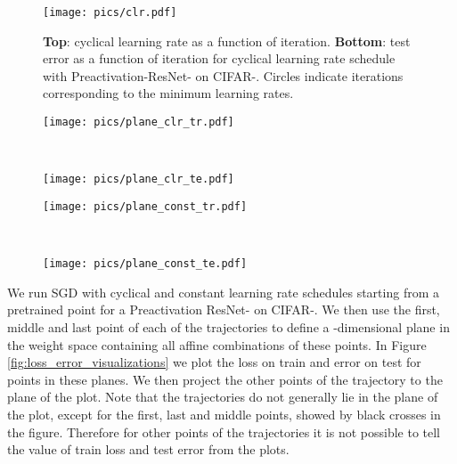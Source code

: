 \documentclass[letterpaper]{article}
\begin{document}
\begin{figure}[!t]
	\centering
	\texttt{[image: pics/clr.pdf]}
	\caption{
        \textbf{Top}: cyclical learning rate as a function of iteration. 
        \textbf{Bottom}: test error as a function of iteration
        for cyclical learning rate schedule with Preactivation-ResNet- on 
        CIFAR-.
        Circles indicate iterations corresponding to the minimum learning rates.
    }
	\label{fig:lr}    	
\end{figure}

\begin{figure*}[!h]
	\centering
	\begin{subfigure}{0.24\textwidth}
    \texttt{[image: pics/plane\_clr\_tr.pdf]}
	\end{subfigure}
	~
	\begin{subfigure}{0.24\textwidth}
		\texttt{[image: pics/plane\_clr\_te.pdf]}
	\end{subfigure}
	\begin{subfigure}{0.24\textwidth}
		\texttt{[image: pics/plane\_const\_tr.pdf]}
	\end{subfigure}
	~
	\begin{subfigure}{0.24\textwidth}
		\texttt{[image: pics/plane\_const\_te.pdf]}
	\end{subfigure}
	\caption{
      The -regularized cross-entropy train loss and test error 
      surfaces of a Preactivation ResNet-
	    on CIFAR- in the plane containing the first, middle and last points (indicated by black crosses)
      in the trajectories with (\textbf{left two}) cyclical 
      and (\textbf{right two}) constant learning rate schedules.
  }
	\label{fig:loss_error_visualizations}
\end{figure*}

We run SGD with cyclical and constant learning rate schedules starting
from a pretrained point for a Preactivation ResNet- on CIFAR-. 
We then use the first, middle and last point of each of the trajectories to define
a -dimensional plane in the weight space containing all affine combinations
of these points. 
In Figure \ref{fig:loss_error_visualizations}
we plot the loss on train and error on test for points in these planes.
We then project the other points of the trajectory to the plane of the plot.
Note that the trajectories do not generally lie in the plane of the plot,
except for the first, last and middle points, showed by black crosses in the
figure. Therefore for other points of the trajectories it is not possible to tell the
value of train loss and test error from the plots.
\end{document}
